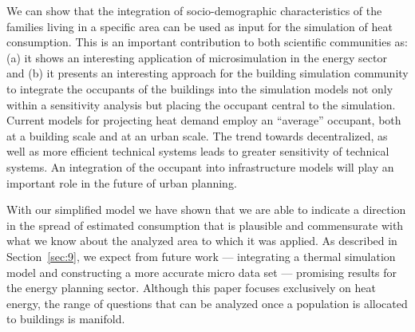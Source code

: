 \documentclass[11pt]{IJM-article}
\begin{document}
We can show that the integration of socio-demographic characteristics of the
families living in a specific area can be used as input for the simulation of
heat consumption. This is an important contribution to both scientific
communities as: (a) it shows an interesting application of microsimulation in
the energy sector and (b) it presents an interesting approach for the building
simulation community to integrate the occupants of the buildings into the
simulation models not only within a sensitivity analysis but placing the
occupant central to the simulation.  Current models for projecting heat demand
employ an ``average'' occupant, both at a building scale and at an urban scale.
The trend towards decentralized, as well as more efficient technical systems
leads to greater sensitivity of technical systems. An integration of the
occupant into infrastructure models will play an important role in the future
of urban planning.

With our simplified model we have shown that we are able to indicate a
direction in the spread of estimated consumption that is plausible and
commensurate with what we know about the analyzed area to which it was applied.
As described in Section~\ref{sec:9}, we expect from future work --- integrating
a thermal simulation model and constructing a more accurate micro data set ---
promising results for the energy planning sector. Although this paper focuses
exclusively on heat energy, the range of questions that can be analyzed once a
population is allocated to buildings is manifold.


\renewcommand{\refname}{REFERENCES}


\end{document}
